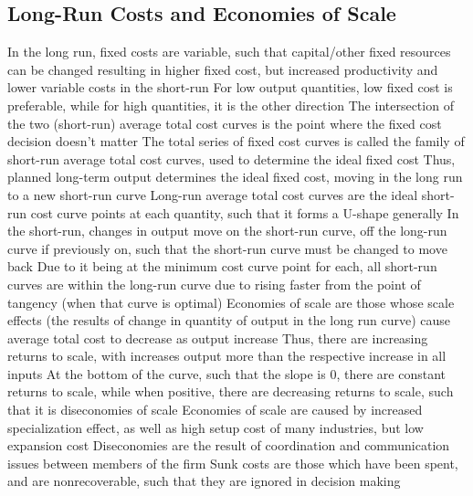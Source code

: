 \documentclass[11 pt, twoside]{article}
\newenvironment{outline*}
{
	\begin{outline}[enumerate]
	}
	{\end{outline}
}
\begin{document}
\subsection{Long-Run Costs and Economies of Scale}
\begin{outline*}
\1 In the long run, fixed costs are variable, such that capital/other fixed resources can be changed resulting in higher fixed cost, but increased productivity and lower variable costs in the short-run
\2 For low output quantities, low fixed cost is preferable, while for high quantities, it is the other direction
\2 The intersection of the two (short-run) average total cost curves is the point where the fixed cost decision doesn't matter
\2 The total series of fixed cost curves is called the family of short-run average total cost curves, used to determine the ideal fixed cost
\2 Thus, planned long-term output determines the ideal fixed cost, moving in the long run to a new short-run curve
\1 Long-run average total cost curves are the ideal short-run cost curve points at each quantity, such that it forms a U-shape generally
\2 In the short-run, changes in output move on the short-run curve, off the long-run curve if previously on, such that the short-run curve must be changed to move back
\2 Due to it being at the minimum cost curve point for each, all short-run curves are within the long-run curve due to rising faster from the point of tangency (when that curve is optimal)
\1 Economies of scale are those whose scale effects (the results of change in quantity of output in the long run curve) cause average total cost to decrease as output increase
\2 Thus, there are increasing returns to scale, with increases output more than the respective increase in all inputs
\2 At the bottom of the curve, such that the slope is 0, there are constant returns to scale, while when positive, there are decreasing returns to scale, such that it is diseconomies of scale
\1 Economies of scale are caused by increased specialization effect, as well as high setup cost of many industries, but low expansion cost
\2 Diseconomies are the result of coordination and communication issues between members of the firm
\1 Sunk costs are those which have been spent, and are nonrecoverable, such that they are ignored in decision making
\end{outline*}
\end{document}
